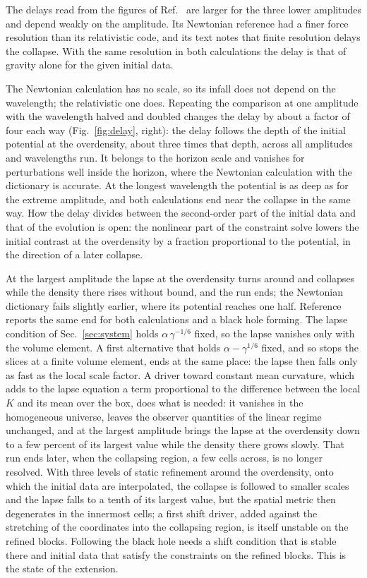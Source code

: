 \documentclass[aps,prd,twocolumn,10pt,superscriptaddress,nofootinbib,longbibliography,floatfix]{revtex4-2}
\begin{document}
The delays read from the figures of Ref.~\cite{East:2019chx} are larger for the three lower amplitudes and depend weakly on the amplitude. Its Newtonian reference had a finer force resolution than its relativistic code, and its text notes that finite resolution delays the collapse. With the same resolution in both calculations the delay is that of gravity alone for the given initial data.

The Newtonian calculation has no scale, so its infall does not depend on the wavelength; the relativistic one does. Repeating the comparison at one amplitude with the wavelength halved and doubled changes the delay by about a factor of four each way (Fig.~\ref{fig:delay}, right): the delay follows the depth of the initial potential at the overdensity, about three times that depth, across all amplitudes and wavelengths run. It belongs to the horizon scale and vanishes for perturbations well inside the horizon, where the Newtonian calculation with the dictionary is accurate. At the longest wavelength the potential is as deep as for the extreme amplitude, and both calculations end near the collapse in the same way. How the delay divides between the second-order part of the initial data and that of the evolution is open: the nonlinear part of the constraint solve lowers the initial contrast at the overdensity by a fraction proportional to the potential, in the direction of a later collapse.

At the largest amplitude the lapse at the overdensity turns around and collapses while the density there rises without bound, and the run ends; the Newtonian dictionary fails slightly earlier, where its potential reaches one half. Reference~\cite{East:2019chx} reports the same end for both calculations and a black hole forming. The lapse condition of Sec.~\ref{sec:system} holds $\alpha\,\gamma^{-1/6}$ fixed, so the lapse vanishes only with the volume element. A first alternative that holds $\alpha - \gamma^{1/6}$ fixed, and so stops the slices at a finite volume element, ends at the same place: the lapse then falls only as fast as the local scale factor. A driver toward constant mean curvature, which adds to the lapse equation a term proportional to the difference between the local $K$ and its mean over the box, does what is needed: it vanishes in the homogeneous universe, leaves the observer quantities of the linear regime unchanged, and at the largest amplitude brings the lapse at the overdensity down to a few percent of its largest value while the density there grows slowly. That run ends later, when the collapsing region, a few cells across, is no longer resolved. With three levels of static refinement around the overdensity, onto which the initial data are interpolated, the collapse is followed to smaller scales and the lapse falls to a tenth of its largest value, but the spatial metric then degenerates in the innermost cells; a first shift driver, added against the stretching of the coordinates into the collapsing region, is itself unstable on the refined blocks. Following the black hole needs a shift condition that is stable there and initial data that satisfy the constraints on the refined blocks. This is the state of the extension.
\end{document}

